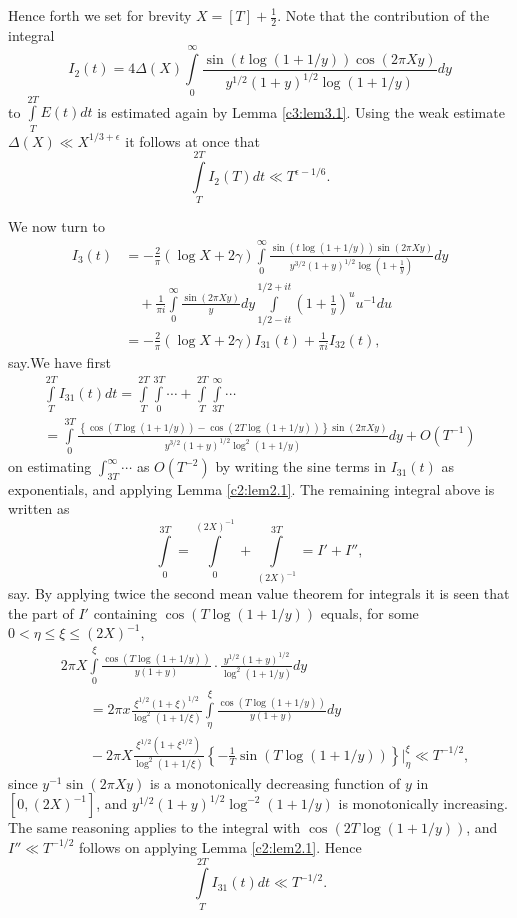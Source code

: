 Hence forth we set for brevity $X= [T]+ \frac{1}{2}$. Note that the
contribution of the integral
$$
I_2 (t) = 4 \Delta (X) \int\limits_0^\infty \frac{\sin (t \log (1+
  1/y))\cos (2 \pi Xy)}{y^{1/2} (1+y)^{1/2} \log (1+ 1/y)}dy
$$ 
to $\displaystyle{\int\limits_{T}^{2T} E(t) dt}$ is estimated again by
  Lemma \ref{c3:lem3.1}. Using the weak estimate $\Delta (X) \ll
  X^{1/3+\epsilon}$ it follows at once that
$$
\int\limits_T^{2T} I_2 (T) dt \ll T^{\epsilon -1/6}.
$$

We now turn to 
\begin{align*}
  I_3 (t) & =- \frac{2}{\pi} \left(\log X + 2 \gamma \right)
  \int\limits_0^\infty \frac{\sin (t \log (1+ 1/y)) \sin (2 \pi
    Xy)}{y^{3/2} (1+y)^{1/2} \log \left(1+ \frac{1}{y} \right)}
  dy\\
  &\quad+ \frac{1}{\pi i} \int\limits_0^\infty \frac{\sin (2 \pi Xy)}{y}
  dy \int\limits_{1/2 - it}^{1/2 + it} \left(1+ \frac{1}{y} \right)^u
  u^{-1}du\\
  & = - \frac{2}{\pi} (\log X + 2 \gamma) I_{31} (t) + \frac{1}{\pi i}
  I_{32} (t),
\end{align*}
say.\pageoriginale We have first
{\fontsize{10}{12}\selectfont
\begin{multline*}
  \int\limits_T^{2T} I_{31} (t) dt = \int\limits_T^{2T} \int\limits_0^{3T}
  \cdots + \int\limits_T^{2T} \int\limits_{3T}^\infty \cdots\\
  = \int\limits_0^{3T} \frac{\left\{\cos (T \log (1+ 1/y)) - \cos (2T
    \log (1+ 1/y)) \right\} \sin (2 \pi Xy)}{y^{3/2} (1+ y)^{1/2}
    \log^2 (1+ 1/y)} dy + O(T^{-1})
\end{multline*}}
on estimating $\int_{3T}^\infty \cdots$ as $O(T^{-2})$ by writing the
sine terms in $I_{31}(t)$ as exponentials, and applying Lemma
\ref{c2:lem2.1}. The remaining integral above is written as 
$$
\int\limits_0^{3T} = \int\limits_{0}^{(2X)^{-1}} +
\int\limits_{(2X)^{-1}}^{3T} = I' + I'',
$$
say. By applying twice the second mean value theorem for integrals it
is seen that the part of $I'$ containing  $\cos (T \log (1+ 1/y))$
equals, for some $0< \eta \leq \xi \leq (2X)^{-1}$,
\begin{align*}
  & 2 \pi X \int\limits_0^\xi \frac{\cos (T \log (1+ 1/y))}{y(1+y)}
  \cdot \frac{y^{1/2} (1+ y)^{1/2}}{\log^2 (1+ 1/y)}dy\\
  &\qquad = 2 \pi x \frac{\xi^{1/2} (1+ \xi)^{1/2}}{\log^2 (1+ 1/\xi)}
  \int\limits_\eta^\xi \frac{\cos (T \log (1+ 1/y))}{y(1+y)}dy\\
  &\qquad - 2 \pi X \frac{\xi^{1/2}(1 + \xi^{1/2})}{\log^2 (1+1/\xi)}
  \left\{- \frac{1}{T} \sin (T \log (1+ 1/y)) \right\} \Bigg|_\eta^\xi
  \ll T^{-1/2},
\end{align*}
since $y^{-1} \sin (2 \pi Xy)$ is a monotonically decreasing function
of $y$ in\break $[0, (2X)^{-1}]$, and $y^{1/2} (1+y)^{1/2} \log^{-2} (1+
1/y)$ is monotonically increasing. The same reasoning applies to the
integral with $\cos (2T \log (1+ 1/y))$, 
and\pageoriginale $I'' \ll T^{-1/2}$ follows on applying Lemma
\ref{c2:lem2.1}. Hence
$$
\int\limits_T^{2T} I_{31} (t) dt \ll T^{-1/2}.
$$ 

